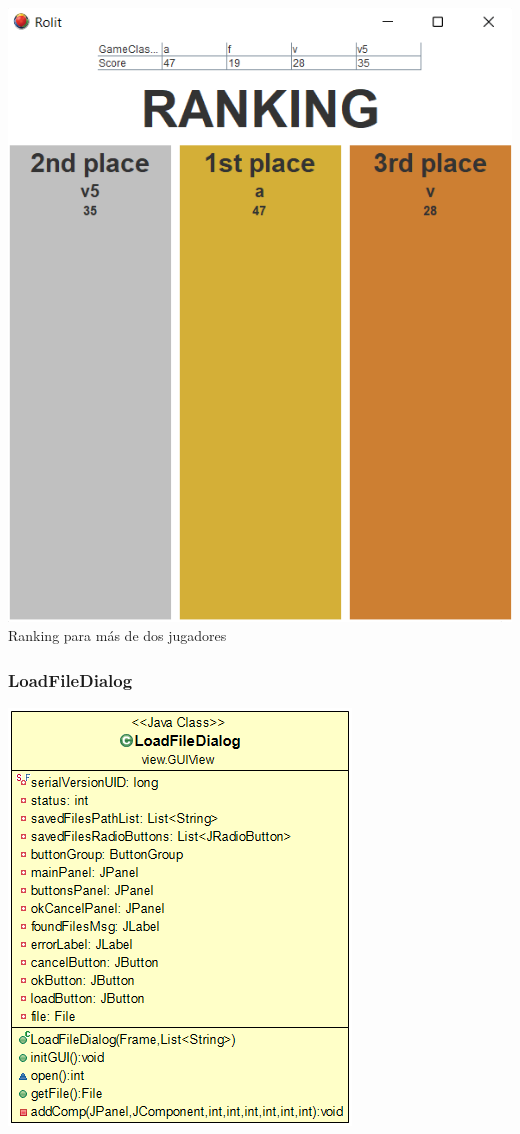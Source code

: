\documentclass[../DocumentoOficial.tex]{subfiles}
\begin{document}
\begin{center}
\includegraphics[scale=0.6]{ranking-3players.png}\\
\footnotesize{Ranking para más de dos jugadores}
\end{center}

\subsubsection{LoadFileDialog}
\begin{center}
\includegraphics[scale=0.6]{loaddialoguml.png}
\end{center}
\end{document}
